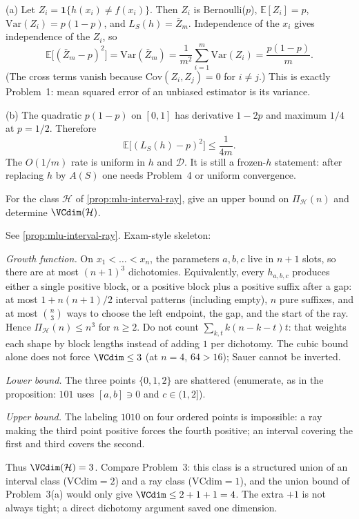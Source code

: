 \begin{solution}
(a) Let $Z_i=\mathbf{1}\{h(x_i)\ne f(x_i)\}$. Then $Z_i$ is Bernoulli($p$), $\mathbb{E}[Z_i]=p$, $\mathrm{Var}(Z_i)=p(1-p)$, and $L_S(h)=\bar Z_m$. Independence of the $x_i$ gives independence of the $Z_i$, so
\[
\mathbb{E}\bigl[(\bar Z_m-p)^2\bigr]
=
\mathrm{Var}(\bar Z_m)
=
\frac1{m^2}\sum_{i=1}^m\mathrm{Var}(Z_i)
=
\frac{p(1-p)}{m}.
\]
(The cross terms vanish because $\mathrm{Cov}(Z_i,Z_j)=0$ for $i\ne j$.) This is exactly Problem~1: mean squared error of an unbiased estimator is its variance.

(b) The quadratic $p(1-p)$ on $[0,1]$ has derivative $1-2p$ and maximum $1/4$ at $p=1/2$. Therefore
\[
\mathbb{E}\bigl[(L_S(h)-p)^2\bigr]
\le
\frac{1}{4m}.
\]
The $O(1/m)$ rate is uniform in $h$ and $\mathcal{D}$. It is still a frozen-$h$ statement: after replacing $h$ by $A(S)$ one needs Problem~4 or uniform convergence.
\end{solution}

\begin{exercise}
\label{ex:mlu-interval-ray}
For the class $\mathcal{H}$ of \cref{prop:mlu-interval-ray}, give an upper bound on $\Pi_{\mathcal{H}}(n)$ and determine $\VCdim(\mathcal{H})$.
\end{exercise}

\begin{solution}
See \cref{prop:mlu-interval-ray}. Exam-style skeleton:

\textit{Growth function.}
On $x_1<\dots<x_n$, the parameters $a,b,c$ live in $n+1$ slots, so there are at most $(n+1)^3$ dichotomies. Equivalently, every $h_{a,b,c}$ produces either a single positive block, or a positive block plus a positive suffix after a gap: at most $1+n(n+1)/2$ interval patterns (including empty), $n$ pure suffixes, and at most $\binom{n}{3}$ ways to choose the left endpoint, the gap, and the start of the ray. Hence $\Pi_{\mathcal{H}}(n)\le n^3$ for $n\ge 2$. Do not count $\sum_{k,t}k(n-k-t)t$: that weights each shape by block lengths instead of adding $1$ per dichotomy. The cubic bound alone does not force $\VCdim\le 3$ (at $n=4$, $64>16$); Sauer cannot be inverted.

\textit{Lower bound.}
The three points $\{0,1,2\}$ are shattered (enumerate, as in the proposition: $101$ uses $[a,b]\ni 0$ and $c\in(1,2]$).

\textit{Upper bound.}
The labeling $1010$ on four ordered points is impossible: a ray making the third point positive forces the fourth positive; an interval covering the first and third covers the second.

Thus $\VCdim(\mathcal{H})=3$. Compare Problem~3: this class is a structured union of an interval class ($\mathrm{VCdim}=2$) and a ray class ($\mathrm{VCdim}=1$), and the union bound of Problem~3(a) would only give $\VCdim\le 2+1+1=4$. The extra $+1$ is not always tight; a direct dichotomy argument saved one dimension.
\end{solution}

